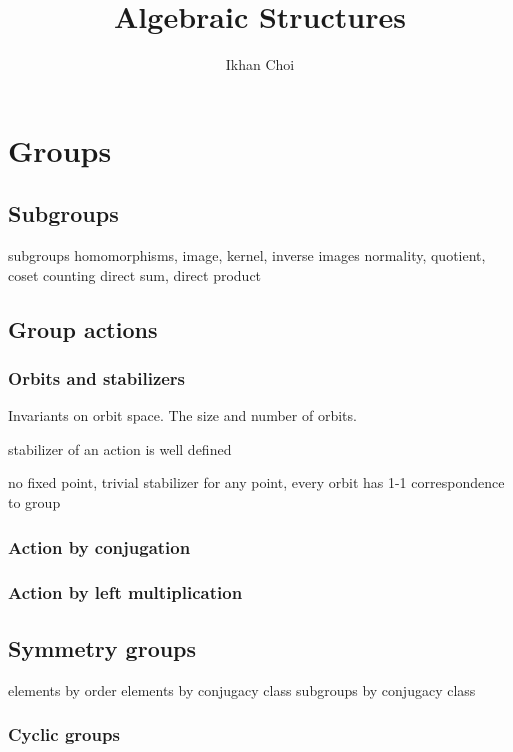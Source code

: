 \documentclass{../note}
\begin{document}
\title{Algebraic Structures}
\author{Ikhan Choi}
\maketitle
\tableofcontents

\part{Groups}
\chapter{Subgroups}
subgroups
homomorphisms, image, kernel, inverse images
normality, quotient, coset counting
direct sum, direct product

\chapter{Group actions}
\section{Orbits and stabilizers}
Invariants on orbit space.
The size and number of orbits.

\begin{prb}
stabilizer of an action is well defined

\end{prb}

\begin{prb}
no fixed point,
trivial stabilizer for any point,
every orbit has 1-1 correspondence to group
\end{prb}

\section{Action by conjugation}
\section{Action by left multiplication}


\chapter{Symmetry groups}

elements by order
elements by conjugacy class
subgroups by conjugacy class


\section{Cyclic groups}
\end{document}
